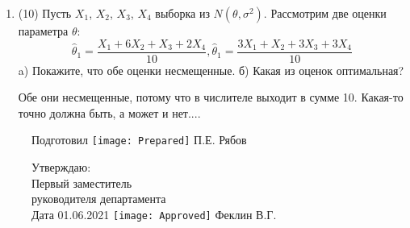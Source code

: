 \documentclass[a4paper,14pt]{article}
\begin{document}
\begin{enumerate}
\item


(10) Пусть $X _{1}$, $X _{2}$, $X _{3}$, $X _{4}$ выборка из $N(\theta, \sigma ^{2})$. Рассмотрим две оценки параметра $\theta$:
\[\hat \theta _{1} = \frac{X _{1} + 6X _{2} + X _{3} + 2X _{4}}{10}, \hat \theta _{1} = \frac{3X _{1} + X _{2} + 3X _{3} + 3X _{4}}{10}\]
a) Покажите, что обе оценки несмещенные.
б) Какая из оценок оптимальная?




Обе они несмещенные, потому что в числителе выходит в сумме 10.
Какая-то точно должна быть, а может и нет....


\end{enumerate}

\begin{figure}[H]
	Подготовил
	\hfill
	\texttt{[image: Prepared]}
	П.Е. Рябов
\end{figure}


\begin{figure}[H]
	Утверждаю:\\
	Первый заместитель\\
	руководителя департамента\\
	Дата 01.06.2021
	\hfill
	\texttt{[image: Approved]}
	Феклин В.Г.
\end{figure}
\end{document}
